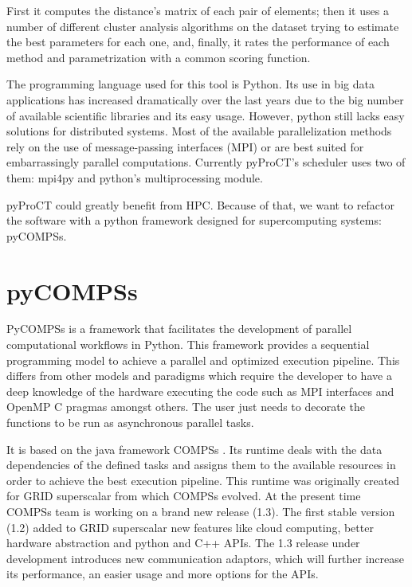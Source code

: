 First it computes the distance's matrix of each pair of elements; then it uses a number of different cluster analysis algorithms on the dataset trying to estimate the best parameters for each one, and, finally, it rates the performance of each method and parametrization with a common scoring function.

The programming language used for this tool is Python. Its use in big data applications has increased dramatically over the last years due to the big number of available scientific libraries and its easy usage. However, python still lacks easy solutions for distributed systems. Most of the available parallelization methods rely on the use of message-passing interfaces (MPI) or are best suited for embarrassingly parallel computations. Currently pyProCT's scheduler uses two of them: mpi4py \cite{Dalcin2008} and python's multiprocessing module.

pyProCT could greatly benefit from HPC. Because of that, we want to refactor the software with a python framework designed for supercomputing systems: pyCOMPSs.


\section{pyCOMPSs}


PyCOMPSs \cite{Tejedor2015} is a framework that facilitates the development of parallel computational workflows in Python. This framework provides a sequential programming model to achieve a parallel and optimized execution pipeline. This differs from other models and paradigms which require the developer to have a deep knowledge of the hardware executing the code such as MPI interfaces and OpenMP C pragmas amongst others. The user just needs to decorate the functions to be run as asynchronous parallel tasks. 

It is based on the java framework COMPSs \cite{Lordan2013}. Its runtime deals with the data dependencies of the defined tasks and assigns them to the available resources in order to achieve the best execution pipeline. This runtime was originally created for GRID superscalar \cite{Badia2003} from which COMPSs evolved. At the present time COMPSs team is working on a brand new release (1.3). The first stable version (1.2) added to GRID superscalar new features like cloud computing, better hardware abstraction and python and C++ APIs. The 1.3 release under development introduces new communication adaptors, which will further increase its performance, an easier usage and more options for the APIs. 


